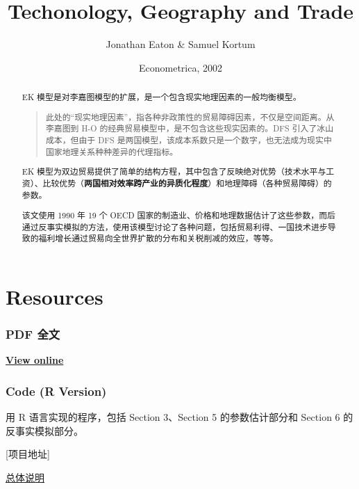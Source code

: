 \documentclass[
]{article}
\title{Techonology, Geography and Trade}
\author{Jonathan Eaton \& Samuel Kortum}
\date{Econometrica, 2002}
\begin{document}
\maketitle
\begin{abstract}
EK 模型是对李嘉图模型的扩展，是一个包含现实地理因素的一般均衡模型。

\begin{quote}
此处的``现实地理因素''，指各种非政策性的贸易障碍因素，不仅是空间距离。从李嘉图到 H-O 的经典贸易模型中，是不包含这些现实因素的。DFS 引入了冰山成本，但由于 DFS 是两国模型，该成本系数只是一个数字，也无法成为现实中国家地理关系种种差异的代理指标。
\end{quote}

EK 模型为双边贸易提供了简单的结构方程，其中包含了反映绝对优势（技术水平与工资）、比较优势（\textbf{两国相对效率跨产业的异质化程度}）和地理障碍（各种贸易障碍）的参数。

该文使用 1990 年 19 个 OECD 国家的制造业、价格和地理数据估计了这些参数，而后通过反事实模拟的方法，使用该模型讨论了各种问题，包括贸易利得、一国技术进步导致的福利增长通过贸易向全世界扩散的分布和关税削减的效应，等等。
\end{abstract}

{
\setcounter{tocdepth}{3}
\tableofcontents
}
\hypertarget{resources}{%
\section*{Resources}\label{resources}}

\hypertarget{pdf-ux5168ux6587}{%
\subsubsection*{PDF 全文}\label{pdf-ux5168ux6587}}

\href{../pdf/EK2002.pdf}{\textbf{View online}}

\hypertarget{code-r-version}{%
\subsubsection*{Code (R Version)}\label{code-r-version}}

用 R 语言实现的程序，包括 Section 3、Section 5 的参数估计部分和 Section 6 的反事实模拟部分。

{[}项目地址{]}

\href{../../EK2002-code/R/README.html}{总体说明}
\end{document}
